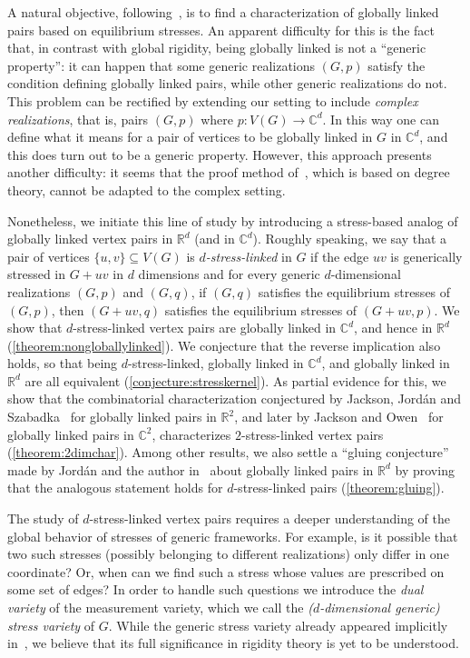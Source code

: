 \documentclass[11pt,a4paper,dvipsnames]{scrartcl}
\theoremstyle{definition}
\newcommand{\RR}{\mathbb{R}}
\newcommand{\CC}{\mathbb{C}}
\newcommand{\strongly}[1]{${#1}$-stress-linked}
\begin{document}
A natural objective, following~\cite{gortler.etal_2010}, is to find a characterization of globally linked pairs based on equilibrium stresses. An apparent difficulty for this is the fact that, in contrast with global rigidity, being globally linked is not a ``generic property'': it can happen that some generic realizations $(G,p)$ satisfy the condition defining globally linked pairs, while other generic realizations do not. This problem can be rectified by extending our setting to include \emph{complex realizations}, that is, pairs $(G,p)$ where $p : V(G) \rightarrow \CC^d$. %
In this way one can define what it means for a pair of vertices to be globally linked in $G$ in $\CC^d$, and this does turn out to be a generic property. However, this approach presents another difficulty: it seems that the proof method of~\cite{gortler.etal_2010}, which is based on degree theory, cannot be adapted to the complex setting. 

Nonetheless, we 
initiate this line of study 
by introducing a stress-based analog of globally linked vertex pairs in $\RR^d$ (and in $\CC^d$). Roughly speaking, we say that a pair of vertices $\{u,v\} \subseteq V(G)$ is \emph{\strongly{d}} in $G$ if the edge $uv$ is generically stressed in $G+uv$ in $d$ dimensions and for every generic $d$-dimensional realizations $(G,p)$ and $(G,q)$, if $(G,q)$ satisfies the equilibrium stresses of $(G,p)$, then $(G+uv,q)$ satisfies the equilibrium stresses of $(G+uv,p)$. We show that \strongly{d} vertex pairs are globally linked in $\CC^d$, and hence in $\RR^d$ (\cref{theorem:nongloballylinked}). 
We conjecture that the reverse implication also holds, so that being \strongly{d}, globally linked in $\CC^d$, and globally linked in $\RR^d$ are all equivalent (\cref{conjecture:stresskernel}).
As partial evidence for this, 
we show that the combinatorial characterization conjectured  by Jackson, Jordán and Szabadka~\cite{jackson.etal_2006} for globally linked pairs in $\RR^2$, and later by Jackson and Owen~\cite{jackson.owen_2019} for globally linked pairs in $\CC^2$, characterizes \strongly{2} vertex pairs (\cref{theorem:2dimchar}). Among other results, we also settle a ``gluing conjecture'' made by  Jordán and the author in~\cite{garamvolgyi.jordan_2023a} about globally linked pairs in $\RR^d$ by proving that the analogous statement holds for  \strongly{d} pairs (\cref{theorem:gluing}). %

The study of \strongly{d} vertex pairs requires a deeper understanding of the global behavior of stresses of generic frameworks. For example, is it possible that two such stresses (possibly belonging to different realizations) only differ in one coordinate? Or, when can we find such a stress whose values are prescribed on some set of edges? In order to handle such questions we introduce the \emph{dual variety} of the measurement variety, which we call the \emph{($d$-dimensional generic) stress variety} of $G$. While the generic stress variety already appeared implicitly in~\cite{gortler.etal_2010}, we believe that its full significance in rigidity theory is yet to be understood. %
\end{document}
